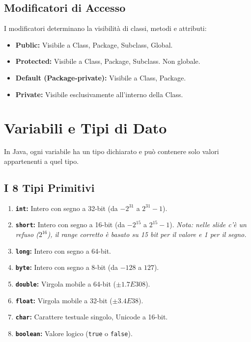 \documentclass[12pt,a4paper,oneside]{book}
\begin{document}
\subsection{Modificatori di Accesso}
I modificatori determinano la visibilità di classi, metodi e attributi:
\begin{itemize}
    \item \textbf{Public:} Visibile a Class, Package, Subclass, Global.
    \item \textbf{Protected:} Visibile a Class, Package, Subclass. Non globale.
    \item \textbf{Default (Package-private):} Visibile a Class, Package.
    \item \textbf{Private:} Visibile esclusivamente all'interno della Class.
\end{itemize}

\section{Variabili e Tipi di Dato}
In Java, ogni variabile ha un tipo dichiarato e può contenere solo valori appartenenti a quel tipo.

\subsection{I 8 Tipi Primitivi}
\begin{enumerate}
    \item \textbf{\texttt{int}:} Intero con segno a 32-bit (da $-2^{31}$ a $2^{31}-1$).
    \item \textbf{\texttt{short}:} Intero con segno a 16-bit (da $-2^{15}$ a $2^{15}-1$). \textit{Nota: nelle slide c'è un refuso ($2^{16}$), il range corretto è basato su 15 bit per il valore e 1 per il segno.}
    \item \textbf{\texttt{long}:} Intero con segno a 64-bit.
    \item \textbf{\texttt{byte}:} Intero con segno a 8-bit (da $-128$ a $127$).
    \item \textbf{\texttt{double}:} Virgola mobile a 64-bit ($\pm1.7E308$).
    \item \textbf{\texttt{float}:} Virgola mobile a 32-bit ($\pm3.4E38$).
    \item \textbf{\texttt{char}:} Carattere testuale singolo, Unicode a 16-bit.
    \item \textbf{\texttt{boolean}:} Valore logico (\texttt{true} o \texttt{false}).
\end{enumerate}
\end{document}
